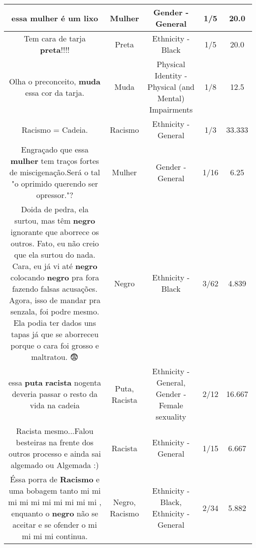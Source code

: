 \documentclass[11pt]{article}
\newlength\mylength
\begin{document}
\begin{center}
\begin{longtable}{|C{.65\mylength}|C{.30\mylength}|C{.12\mylength}|C{.12\mylength}|C{.12\mylength}|}
  \small essa \textbf{mulher} é um lixo\normalsize   & Mulher & Gender - General & 1/5 & 20.0 \\  \hline
  \small Tem cara de tarja \textbf{preta}!!!!\normalsize   & Preta & Ethnicity - Black & 1/5 & 20.0 \\  \hline
  \small Olha o preconceito, \textbf{muda} essa cor da tarja.\normalsize   & Muda & Physical Identity - Physical (and Mental) Impairments & 1/8 & 12.5 \\  \hline
  \small Racismo = Cadeia.\normalsize   & Racismo & Ethnicity - General & 1/3 & 33.333 \\  \hline
  \small Engraçado que essa \textbf{mulher} tem traços fortes de miscigenação.Será o tal "o oprimido querendo ser opressor."?\normalsize   & Mulher & Gender - General & 1/16 & 6.25 \\  \hline
  \small Doida de pedra, ela surtou, mas têm \textbf{negro} ignorante que aborrece os outros. Fato, eu não creio que ela surtou do nada. Cara, eu já vi até \textbf{negro} colocando \textbf{negro} pra fora fazendo falsas acusações. Agora, isso de mandar pra senzala, foi podre mesmo. Ela podia ter dados uns tapas já que se aborreceu porque o cara foi grosso e maltratou. 😨\normalsize   & Negro & Ethnicity - Black & 3/62 & 4.839 \\  \hline
  \small essa \textbf{puta} \textbf{racista} nogenta deveria passar o resto da vida na cadeia\normalsize   & Puta, Racista & Ethnicity - General, Gender - Female sexuality & 2/12 & 16.667 \\  \hline
  \small Racista mesmo...Falou besteiras na frente dos outros processo e ainda sai algemado ou Algemada :)\normalsize   & Racista & Ethnicity - General & 1/15 & 6.667 \\  \hline
  \small Éssa porra de \textbf{Racismo} e uma bobagem  tanto  mi mi mi mi mi mi mi mi mi mi , enquanto  o \textbf{negro} não se aceitar e se ofender o mi mi mi mi continua.\normalsize   & Negro, Racismo & Ethnicity - Black, Ethnicity - General & 2/34 & 5.882 \\  \hline

\end{longtable}
\end{center}
\end{document}
